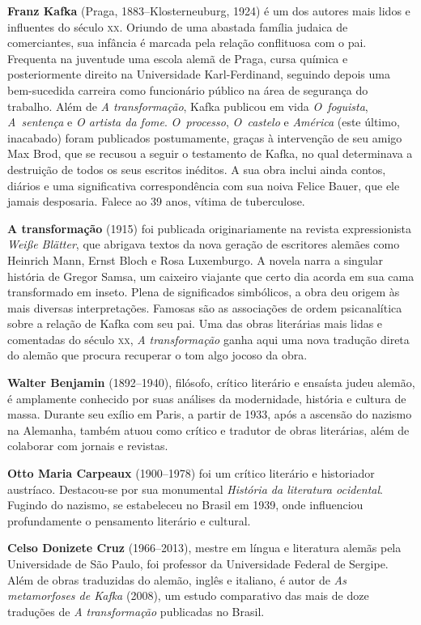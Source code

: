 \textbf{Franz Kafka} (Praga, 1883--Klosterneuburg, 1924) é um dos autores mais lidos 
e influentes do século \textsc{xx}. Oriundo de uma abastada família judaica de
comerciantes, sua infância é marcada pela relação conflituosa com o pai.
Frequenta na juventude uma escola alemã de Praga, cursa química e
posteriormente direito na Universidade Karl{}-Ferdinand, seguindo depois 
uma bem{}-sucedida carreira como funcionário público na área de segurança do trabalho. 
Além de \textit{A transformação}, Kafka publicou em vida \textit{O~foguista}, \textit{A~sentença} e \textit{O artista da fome}. \textit{O~processo}, \textit{O~castelo} e \textit{América} 
(este último, inacabado) foram publicados postumamente, graças à intervenção de 
seu amigo Max Brod, que se recusou a seguir o testamento de Kafka, no qual 
determinava a destruição de todos os seus escritos inéditos. A sua obra inclui
ainda contos, diários e uma significativa correspondência com sua noiva Felice
Bauer, que ele jamais desposaria. Falece ao 39 anos, vítima de tuberculose.

\textbf{A transformação} (1915) foi publicada
originariamente na revista expressionista \textit{Weiße Blätter}, que abrigava
textos da nova geração de escritores alemães como Heinrich Mann, Ernst Bloch e
Rosa Luxemburgo. A novela narra a singular história de Gregor Samsa, um caixeiro
viajante que certo dia acorda em sua cama transformado em inseto. Plena de
significados simbólicos, a obra deu origem às mais diversas interpretações.
Famosas são as associações de ordem psicanalítica sobre a relação de Kafka 
com seu pai. Uma das obras literárias mais lidas e comentadas do século \textsc{xx}, \textit{A transformação} ganha aqui uma nova tradução direta do alemão que procura recuperar o tom algo jocoso da obra.

        
\textbf{Walter Benjamin} (1892--1940), filósofo, crítico literário e ensaísta judeu alemão, é amplamente conhecido por suas análises da modernidade, história e cultura de massa. Durante seu exílio em Paris, a partir de 1933, após a ascensão do nazismo na Alemanha, também atuou como crítico e tradutor de obras literárias, além de colaborar com jornais e revistas.

\textbf{Otto Maria Carpeaux} (1900--1978) foi um crítico literário e historiador austríaco. Destacou-se por sua monumental \textit{História da literatura ocidental}. Fugindo do nazismo, se estabeleceu no Brasil em 1939, onde influenciou profundamente o pensamento literário e cultural.

\textbf{Celso Donizete Cruz} (1966--2013), mestre em língua e literatura alemãs pela Universidade de São Paulo, foi professor da Universidade Federal de Sergipe. Além de obras traduzidas do alemão, inglês e italiano, é autor de \textit{As metamorfoses de Kafka} (2008), um estudo comparativo das mais de doze traduções de \textit{A transformação} publicadas no Brasil.

